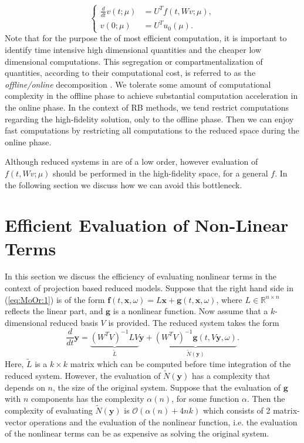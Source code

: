 \begin{equation} \label{eq:3.28}
	\left\{
	\begin{aligned}
	\frac{d}{dt} v(t;\mu) &= U^T f(t,Wv;\mu), \\
	v(0;\mu) &= U^T u_0(\mu).
	\end{aligned}
	\right.
\end{equation}
Note that for the purpose the of most efficient computation, it is important to identify time intensive high dimensional quantities and the cheaper low dimensional computations. This segregation or compartmentalization of quantities, according to their computational cost, is referred to as the \emph{offline/online} decomposition \cite{quarteroni2015reduced}. We tolerate some amount of computational complexity in the offline phase to achieve substantial computation acceleration in the online phase. In the context of RB methods, we tend restrict computations regarding the high-fidelity solution, only to the offline phase. Then we can enjoy fast computations by restricting all computations to the reduced space during the online phase.

Although reduced systems in  are of a low order, however evaluation of $f(t,Wv;\mu)$ should be performed in the high-fidelity space, for a general $f$. In the following section we discuss how we can avoid this bottleneck. 

\section{Efficient Evaluation of Non-Linear Terms}

In this section we discuss the efficiency of evaluating nonlinear terms in the context of projection based reduced models. Suppose that the right hand side in (\ref{eq:MoOr:1}) is of the form $\mathbf f(t,\mathbf x , \omega) = L\mathbf x + \mathbf g(t,\mathbf x ,\omega)$, where $L\in \mathbb R^{n\times n}$ reflects the linear part, and $\mathbf g$ is a nonlinear function. Now assume that a $k$-dimensional reduced basis $V$ is provided. The reduced system takes the form
\begin{equation} \label{eq:MoOr:8}
	\frac{d}{dt} \mathbf y = \underbrace{(W^TV)^{-1} L V}_{\tilde L} \mathbf{y} + \underbrace{(W^TV)^{-1} \mathbf g(t,V\mathbf y,\omega)}_{\tilde N (\mathbf y)}.
\end{equation}
Here, $\tilde L$ is a $k\times k$ matrix which can be computed before time integration of the reduced system. However, the evaluation of $\tilde N (\mathbf y)$ has a complexity that depends on $n$, the size of the original system. Suppose that the evaluation of $\mathbf g$ with $n$ components has the complexity $\alpha(n)$, for some function $\alpha$. Then the complexity of evaluating $\tilde N(\mathbf y)$ is $\mathcal{O}(\alpha(n) + 4nk)$ which consists of 2 matrix-vector operations and the evaluation of the nonlinear function, i.e. the evaluation of the nonlinear terms can be as expensive as solving the original system.

